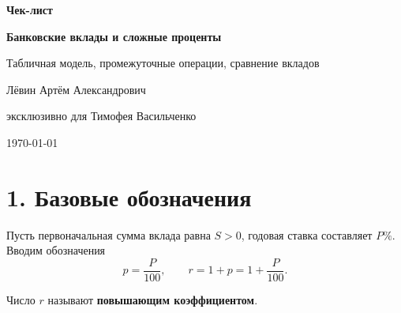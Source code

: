 \documentclass[a4paper,12pt]{article}
\newcommand{\key}[1]{\textcolor{darkaccent}{\textbf{#1}}}
\begin{document}
\begin{titlepage}
  \thispagestyle{empty}
  \centering
  \vspace*{2.2cm}

  {\fontsize{20}{24}\selectfont
    \textcolor{darkaccent}{\textbf{Чек-лист}}\par
  }

  \vspace{0.7cm}

  {\fontsize{25}{30}\selectfont
    \textbf{Банковские вклады и сложные проценты}\par
  }

  \vspace{0.35cm}

  {\Large
    Табличная модель, промежуточные операции, сравнение вкладов\par
  }

  \vfill

  {\large Лёвин Артём Александрович\par}

  \vspace{0.15cm}

  {\large эксклюзивно для Тимофея Васильченко\par}

  \vspace{0.7cm}

  {\large \today\par}

  \vfill

\end{titlepage}

\section*{1. Базовые обозначения}

Пусть первоначальная сумма вклада равна \(S>0\), годовая ставка
составляет \(P\%\). Вводим обозначения
\[
  p=\frac{P}{100},
  \qquad
  r=1+p=1+\frac{P}{100}.
\]

Число \(r\) называют \key{повышающим коэффициентом}.
\end{document}
